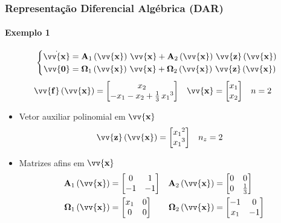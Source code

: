 \documentclass{beamer}
\newcommand*{\Round}[1]{\left(#1\right)}
\newcommand*{\Prod}{\,}
\newcommand*{\Bold}[1]{\boldsymbol{\mathbf{#1}}}
\newcommand*{\Matr}[1]{\Bold{#1}}
\newcommand*{\Vect}[1]{\vv{\Bold{#1}}}
\renewcommand{\Prod}{\,}
\begin{document}
\begin{frame}\frametitle{Representação Diferencial Algébrica (DAR)}\framesubtitle{Exemplo 1}
  \vspace{-20pt}
  \begin{equation}
    \left\{\begin{aligned}
      \dot{\Vect{x}} &= \Matr{A}_1\Round{\Vect{x}} \Prod \Vect{x} + \Matr{A}_2\Round{\Vect{x}} \Prod \Vect{z}\Round{\Vect{x}}
      \\
      \Vect{0} &= \Matr{\Omega}_1\Round{\Vect{x}} \Prod \Vect{x} + \Matr{\Omega}_2\Round{\Vect{x}} \Prod \Vect{z}\Round{\Vect{x}}
    \end{aligned}\right.
  \end{equation}
  \begin{align}
    \Vect{f}\Round{\Vect{x}}
    &= \begin{bmatrix}
      x_2
      \\
      -x_1 -x_2 + \frac{1}{3} \Prod {x_1}^3
    \end{bmatrix}
    &
    \Vect{x}
    &= \begin{bmatrix} x_1 \\ x_2 \end{bmatrix}
    &
    n &= 2
  \end{align}
  \begin{itemize}
    \item Vetor auxiliar polinomial em $\Vect{x}$
    \begin{align}
      \Vect{z}\Round{\Vect{x}} &= \begin{bmatrix} {x_1}^2 \\ {x_1}^3 \end{bmatrix}
      &
      n_z &= 2
    \end{align}
    \item Matrizes afins em $\Vect{x}$
    \begin{align}
      \Matr{A}_1\Round{\Vect{x}}
      &= \begin{bmatrix}
         0 &  1 \\
        -1 & -1 \\
      \end{bmatrix}
      &
      \Matr{A}_2\Round{\Vect{x}}
      &= \begin{bmatrix}
        0 & 0           \\
        0 & \frac{1}{3} \\
      \end{bmatrix}
      \\
      \Matr{\Omega}_1\Round{\Vect{x}}
      &= \begin{bmatrix}
        x_1 & 0 \\
        0   & 0 \\
      \end{bmatrix}
      &
      \Matr{\Omega}_2\Round{\Vect{x}}
      &= \begin{bmatrix}
        -1  & 0  \\
        x_1 & -1 \\
      \end{bmatrix}
    \end{align}
  \end{itemize}
\end{frame}
\end{document}
